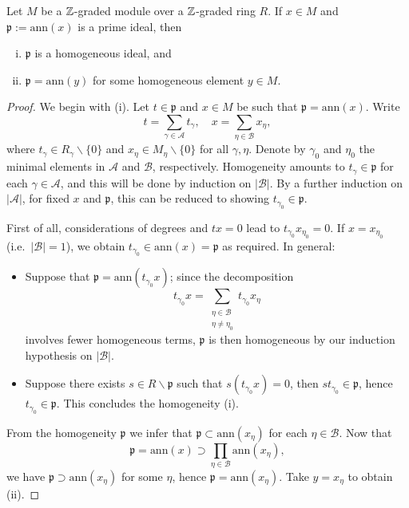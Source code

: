 \begin{lemma}
	Let $M$ be a $\mathbb{Z}$-graded module over a $\mathbb{Z}$-graded ring $R$. If $x \in M$ and $\mathfrak{p} := \text{ann}(x)$ is a prime ideal, then
	\begin{enumerate}[(i)]
		\item $\mathfrak{p}$ is a homogeneous ideal, and
		\item $\mathfrak{p} = \text{ann}(y)$ for some homogeneous element $y \in M$.
	\end{enumerate}
\end{lemma}
\begin{proof}
	We begin with (i). Let $t \in \mathfrak{p}$ and $x \in M$ be such that $\mathfrak{p} = \text{ann}(x)$. Write
	\[ t = \sum_{\gamma \in \mathcal{A}} t_\gamma, \quad x = \sum_{\eta \in \mathcal{B}} x_\eta, \]
	where $t_\gamma \in R_\gamma \smallsetminus \{0\}$ and $x_\eta \in M_\eta \smallsetminus \{0\}$ for all $\gamma, \eta$. Denote by $\gamma_0$ and $\eta_0$ the minimal elements in $\mathcal{A}$ and $\mathcal{B}$, respectively. Homogeneity amounts to $t_\gamma \in \mathfrak{p}$ for each $\gamma \in \mathcal{A}$, and this will be done by induction on $|\mathcal{B}|$. By a further induction on $|\mathcal{A}|$, for fixed $x$ and $\mathfrak{p}$, this can be reduced to showing $t_{\gamma_0} \in \mathfrak{p}$.
	
	First of all, considerations of degrees and $tx=0$ lead to $t_{\gamma_0} x_{\eta_0} = 0$. If $x = x_{\eta_0}$ (i.e.\ $|\mathcal{B}| = 1$), we obtain $t_{\gamma_0} \in \text{ann}(x) = \mathfrak{p}$ as required. In general:
	\begin{itemize}
		\item Suppose that $\mathfrak{p} = \text{ann}(t_{\gamma_0} x)$; since the decomposition
		\[ t_{\gamma_0} x = \sum_{\substack{\eta \in \mathcal{B} \\ \eta \neq \eta_0}} t_{\gamma_0} x_\eta \]
		involves fewer homogeneous terms, $\mathfrak{p}$ is then homogeneous by our induction hypothesis on $|\mathcal{B}|$.
		\item Suppose there exists $s \in R \smallsetminus \mathfrak{p}$ such that $s(t_{\gamma_0} x) = 0$, then $st_{\gamma_0} \in \mathfrak{p}$, hence $t_{\gamma_0} \in \mathfrak{p}$. This concludes the homogeneity (i).
	\end{itemize}
	
	From the homogeneity $\mathfrak{p}$ we infer that $\mathfrak{p} \subset \text{ann}(x_\eta)$ for each $\eta \in \mathcal{B}$. Now that
	\[ \mathfrak{p} = \text{ann}(x) \supset \prod_{\eta \in \mathcal{B}} \text{ann}(x_\eta), \]
	we have $\mathfrak{p} \supset \text{ann}(x_\eta)$ for some $\eta$, hence $\mathfrak{p} = \text{ann}(x_\eta)$. Take $y = x_\eta$ to obtain (ii).
\end{proof}

